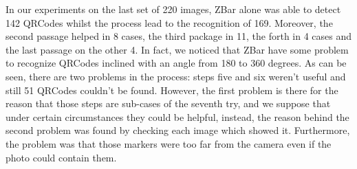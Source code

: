 In our experiments on the last set of 220 images, ZBar alone was able to detect 142 QRCodes whilst the process lead to the recognition of 169. Moreover, the second passage helped in 8 cases, the third package in 11, the forth in 4 cases and the last passage on the other 4. In fact, we noticed that ZBar have some problem to recognize QRCodes inclined with an angle from 180 to 360 degrees.
As can be seen, there are two problems in the process: steps five and six weren't useful and still 51 QRCodes couldn't be found. However, the first problem is there for the reason that those steps are sub-cases of the seventh try, and we suppose that under certain circumstances they could be helpful, instead, the reason behind the second problem was found by checking each image which showed it. Furthermore, the problem was that those markers were too far from the camera even if the photo could contain them.

\section{}

